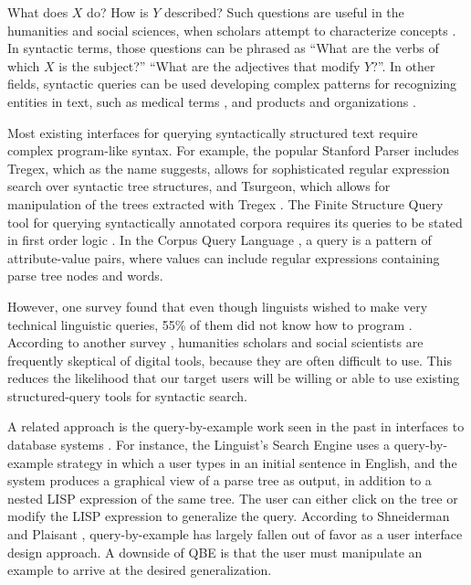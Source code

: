
What does $X$ do? How is $Y$ described? Such questions are useful in the humanities and social sciences, when scholars attempt to characterize concepts \cite{muralidharan2013supporting}. In syntactic terms, those questions can be phrased as ``What are the verbs of which $X$ is the subject?'' ``What are the adjectives that modify $Y$?''. In other fields, syntactic queries can be used  developing complex patterns for recognizing entities in text, such as medical terms \cite{hirschman2005overview,maclean2013identifying}, and  products and organizations \cite{culotta2005reducing}.

Most existing interfaces for querying syntactically structured text require complex program-like syntax. For example, the popular Stanford Parser includes Tregex, which as the name suggests,  allows for sophisticated regular expression search over syntactic tree structures, and Tsurgeon, which allows for manipulation of the trees extracted with Tregex \cite{levy2006tregex}. The Finite Structure Query tool for querying syntactically annotated corpora requires its queries to be stated in first order logic \cite{kepser2003finite}. In the Corpus Query Language \cite{jakubicek2010fast}, a query is a pattern of attribute-value pairs, where values can include regular expressions containing parse tree nodes and words.

However, one survey found that even though linguists wished to make very technical  linguistic queries, 55\% of them did not know how to program \cite{soehn2008requirements}. According to another survey \cite{gibbs_building_2012}, humanities scholars and social scientists are frequently skeptical of digital tools, because they are often difficult to use. This reduces the likelihood that our target users will be willing or able to use existing structured-query tools for syntactic search.

A related approach is the query-by-example work seen in the past in interfaces to database systems \cite{androutsopoulos1995natural}. For instance, the Linguist's Search Engine \cite{resnik2005web} uses a query-by-example strategy in which a user types in an initial sentence in English, and the system produces a graphical view of a parse tree as output, in addition to a nested LISP expression of the same tree.  The user can either click on the tree or modify the LISP expression to generalize the query. %
According to Shneiderman and Plaisant \cite{shneiderman2010designing}, query-by-example has largely fallen out of favor as a user interface design approach. A downside of QBE is that the user must manipulate an example to arrive at the desired generalization.


